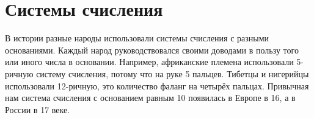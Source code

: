 \section{Системы счисления}\label{sec:notation-systems}

В истории разные народы использовали системы счисления с разными основаниями.
Каждый народ руководствовался своими доводами в пользу того или иного числа в основании.
Например, африканские племена использовали 5-ричную систему счисления, потому что на руке 5 пальцев.
Тибетцы и нигерийцы использовали 12-ричную, это количество фаланг на четырёх пальцах.
Привычная нам система счисления с основанием равным 10 появилась в Европе в 16, а в России в 17 веке.






